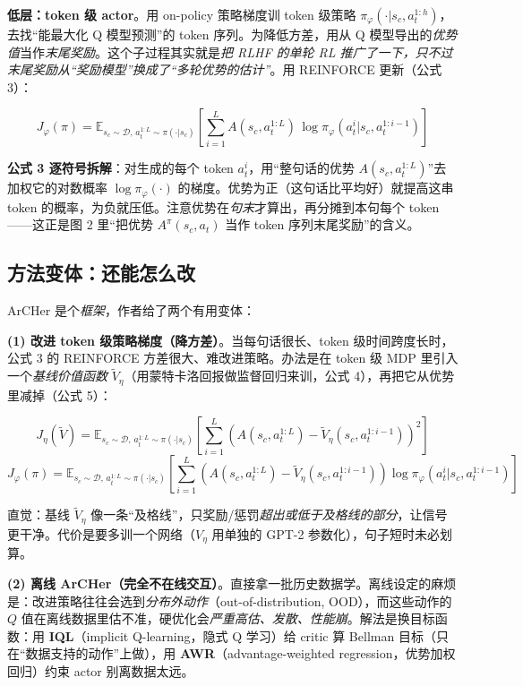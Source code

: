\documentclass[11pt,UTF8,fontset=fandol]{ctexart}
\begin{document}
\textbf{低层：token 级 actor}。用 on-policy 策略梯度训 token 级策略 $\pi_\varphi(\cdot|s_c, a^{1:h}_t)$，去找“能最大化 Q 模型预测”的 token 序列。为降低方差，用从 Q 模型导出的\emph{优势值}当作\emph{末尾奖励}。这个子过程其实就是\emph{把 RLHF 的单轮 RL 推广了一下，只不过末尾奖励从“奖励模型”换成了“多轮优势的估计”}。用 REINFORCE 更新（公式 3）：

\[ J_\varphi(\pi)=\mathbb{E}_{s_c\sim\mathcal{D},\,a^{1:L}_t\sim\pi(\cdot|s_c)}\left[\sum_{i=1}^{L} A(s_c, a^{1:L}_t)\,\log\pi_\varphi(a^i_t|s_c, a^{1:i-1}_t)\right] \tag{3} \]

\textbf{公式 3 逐符号拆解}：对生成的每个 token $a^i_t$，用“整句话的优势 $A(s_c, a^{1:L}_t)$”去加权它的对数概率 $\log\pi_\varphi(\cdot)$ 的梯度。优势为正（这句话比平均好）就提高这串 token 的概率，为负就压低。注意优势在\emph{句末}才算出，再分摊到本句每个 token——这正是图 2 里“把优势 $A^\pi(s_c,a_t)$ 当作 token 序列末尾奖励”的含义。

\subsection{方法变体：还能怎么改}

ArCHer 是个\emph{框架}，作者给了两个有用变体：

\textbf{(1) 改进 token 级策略梯度（降方差）}。当每句话很长、token 级时间跨度长时，公式 3 的 REINFORCE 方差很大、难改进策略。办法是在 token 级 MDP 里引入一个\emph{基线价值函数} $\widetilde{V}_\eta$（用蒙特卡洛回报做监督回归来训，公式 4），再把它从优势里减掉（公式 5）：

\[ J_\eta(\widetilde{V})=\mathbb{E}_{s_c\sim\mathcal{D},\,a^{1:L}_t\sim\pi(\cdot|s_c)}\left[\sum_{i=1}^{L}\left(A(s_c,a^{1:L}_t)-\widetilde{V}_\eta(s_c,a^{1:i-1}_t)\right)^2\right] \tag{4} \]
\[ J_\varphi(\pi)=\mathbb{E}_{s_c\sim\mathcal{D},\,a^{1:L}_t\sim\pi(\cdot|s_c)}\left[\sum_{i=1}^{L}\left(A(s_c,a^{1:L}_t)-\widetilde{V}_\eta(s_c,a^{1:i-1}_t)\right)\log\pi_\varphi(a^i_t|s_c,a^{1:i-1}_t)\right] \tag{5} \]

直觉：基线 $\widetilde{V}_\eta$ 像一条“及格线”，只奖励/惩罚\emph{超出或低于及格线的部分}，让信号更干净。代价是要多训一个网络（$V_\eta$ 用单独的 GPT-2 参数化），句子短时未必划算。

\textbf{(2) 离线 ArCHer（完全不在线交互）}。直接拿一批历史数据学。离线设定的麻烦是：改进策略往往会选到\emph{分布外动作}（out-of-distribution, OOD），而这些动作的 $Q$ 值在离线数据里估不准，硬优化会\emph{严重高估、发散、性能崩}。解法是换目标函数：用 \textbf{IQL}（implicit Q-learning，隐式 Q 学习）给 critic 算 Bellman 目标（只在“数据支持的动作”上做），用 \textbf{AWR}（advantage-weighted regression，优势加权回归）约束 actor 别离数据太远。
\end{document}
